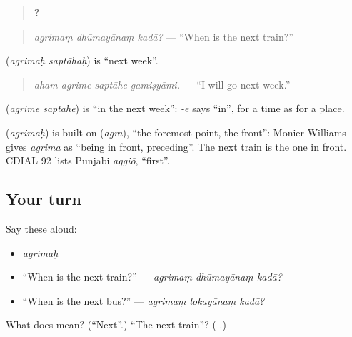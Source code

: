 \begin{quote}
\textbf{  ?}
\end{quote}

\begin{quote}
\emph{agrimaṃ dhūmayānaṃ kadā?} — \textquotedblleft{}When is the next train?\textquotedblright{}
\end{quote}

\textbf{ } (\emph{agrimaḥ saptāhaḥ}) is \textquotedblleft{}next week\textquotedblright{}.

\begin{quote}
\textbf{   }
\end{quote}

\begin{quote}
\emph{aham agrime saptāhe gamiṣyāmi.} — \textquotedblleft{}I will go next week.\textquotedblright{}
\end{quote}

\textbf{ } (\emph{agrime saptāhe}) is \textquotedblleft{}in the next week\textquotedblright{}: \emph{-e} says \textquotedblleft{}in\textquotedblright{}, for a time as for a place.

\begin{cousinweb}
\textbf{} (\emph{agrimaḥ}) is built on \textbf{} (\emph{agra}), \textquotedblleft{}the foremost point, the front\textquotedblright{}: Monier-Williams gives \emph{agrima} as \textquotedblleft{}being in front, preceding\textquotedblright{}. The next train is the one in front. CDIAL 92 lists Punjabi \emph{aggiõ}, \textquotedblleft{}first\textquotedblright{}.
\end{cousinweb}

\subsection*{Your turn}
Say these aloud:

\begin{itemize}
\raggedright
  \item \emph{agrimaḥ}
  \item \textquotedblleft{}When is the next train?\textquotedblright{} — \emph{agrimaṃ dhūmayānaṃ kadā?}
  \item \textquotedblleft{}When is the next bus?\textquotedblright{} — \emph{agrimaṃ lokayānaṃ kadā?}
\end{itemize}

\begin{tcolorbox}[breakable,colback=teal!4,colframe=teal!35!black,title={Before you move on}]
What does \textbf{} mean? (\textquotedblleft{}Next\textquotedblright{}.) \textquotedblleft{}The next train\textquotedblright{}? (\textbf{ }.)
\end{tcolorbox}
